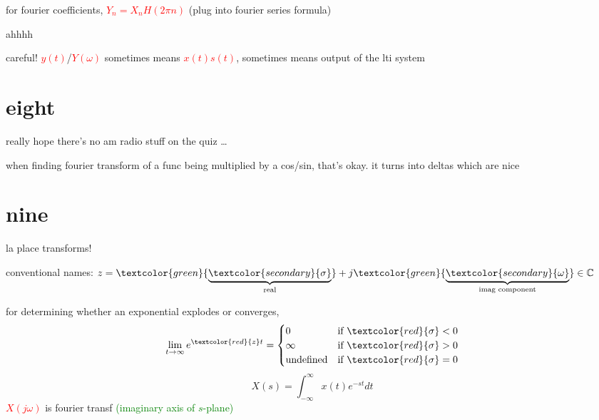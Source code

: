 \documentclass[a5paper, fleqn]{article}
\newcommand{\emf}[1]{\textcolor{red}{#1}}
\newcommand{\note}[1]{\textcolor{green}{#1}}
\newcommand{\eq}[1]{\textcolor{red}{$#1$}}
\newcommand{\under}[2]{\textcolor{green}{\underbrace{\textcolor{secondary}{#1}}_\text{#2}}}
\begin{document}
for fourier coefficients, \eq{Y_n = X_n H(2\pi n)} (plug into fourier series formula)

ahhhh

careful! \eq{y(t)}/\eq{Y(\omega)} sometimes means \eq{x(t) s(t)}, sometimes means output of the lti system

\section*{\textcolor{primary}{eight}}

really hope there's no am radio stuff on the quiz \dots

when finding fourier transform of a func being multiplied by a cos/sin, that's okay. it turns into deltas which are nice

\section*{\textcolor{primary}{nine}}

la place transforms!

conventional names: $z = \under{\sigma}{real} + j\under{\omega}{imag component} \in \mathbb{C}$

for determining whether an exponential explodes or converges,
\[\lim_{t \to \infty} e^{\emf{z}t} = \begin{cases}
    0                & \text{if} ~ \emf{\sigma} < 0 \\
    \infty           & \text{if} ~ \emf{\sigma} > 0 \\
    \text{undefined} & \text{if} ~ \emf{\sigma} = 0 \\
  \end{cases}\]
\[X(s) = \int_{-\infty}^\infty x(t) e^{-st} dt\]
\eq{X(j\omega)} is fourier transf \note{(imaginary axis of $s$-plane)}
\end{document}
